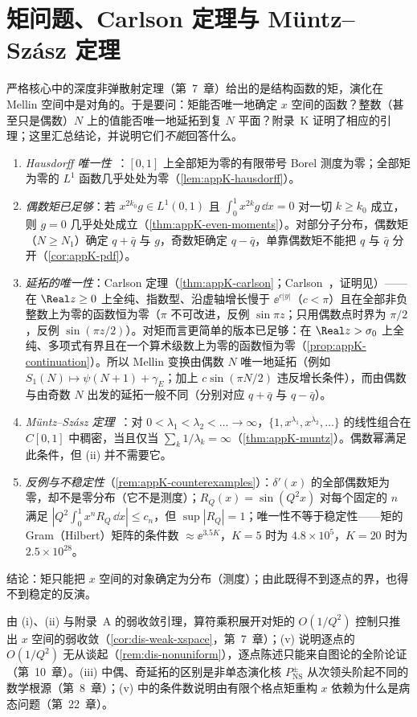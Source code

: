 \section{矩问题、Carlson 定理与 Müntz--Szász 定理}\label{sec:prelim-moments}

严格核心中的深度非弹散射定理（第~7~章）给出的是结构函数的矩，演化在 Mellin 空间中是对角的。于是要问：矩能否唯一地确定 $x$ 空间的函数？整数（甚至只是偶数）$N$ 上的值能否唯一地延拓到复 $N$ 平面？附录~K 证明了相应的引理；这里汇总结论，并说明它们\emph{不能}回答什么。

\begin{remark}[矩问题工具箱]\label{rem:prelim-moment-tools}
\begin{enumerate}[label=(\roman*),leftmargin=2.2em,itemsep=0pt,topsep=2pt]
\item \emph{Hausdorff 唯一性}~\cite{Hausdorff1923}：$[0,1]$ 上全部矩为零的有限带号 Borel 测度为零；全部矩为零的 $L^1$ 函数几乎处处为零（\cref{lem:appK-hausdorff}）。
\item \emph{偶数矩已足够}：若 $x^{2k_0}g\in L^1(0,1)$ 且 $\int_0^1x^{2k}g\,\dd x=0$ 对一切 $k\ge k_0$ 成立，则 $g=0$ 几乎处处成立（\cref{thm:appK-even-moments}）。对部分子分布，偶数矩（$N\ge N_1$）确定 $q+\bar q$ 与 $g$，奇数矩确定 $q-\bar q$，单靠偶数矩不能把 $q$ 与 $\bar q$ 分开（\cref{cor:appK-pdf}）。
\item \emph{延拓的唯一性}：Carlson 定理（\cref{thm:appK-carlson}；Carlson~\cite{Carlson1914}，证明见\cite[第~5.81~节]{Titchmarsh1939}）——在 $\Real z\ge0$ 上全纯、指数型、沿虚轴增长慢于 $\ee^{c|y|}$（$c<\pi$）且在全部非负整数上为零的函数恒为零（$\pi$ 不可改进，反例 $\sin\pi z$；只用偶数点时界为 $\pi/2$，反例 $\sin(\pi z/2)$）。对矩而言更简单的版本已足够：在 $\Real z>\sigma_0$ 上全纯、多项式有界且在一个算术级数上为零的函数恒为零（\cref{prop:appK-continuation}）。所以 Mellin 变换由偶数 $N$ 唯一地延拓（例如 $S_1(N)\mapsto\psi(N+1)+\gamma_E$；加上 $c\sin(\pi N/2)$ 违反增长条件），而由偶数与由奇数 $N$ 出发的延拓一般不同（分别对应 $q+\bar q$ 与 $q-\bar q$）。
\item \emph{Müntz--Szász 定理}~\cite{Muntz1914,Szasz1916}：对 $0<\lambda_1<\lambda_2<\dots\to\infty$，$\{1,x^{\lambda_1},x^{\lambda_2},\dots\}$ 的线性组合在 $C[0,1]$ 中稠密，当且仅当 $\sum_k1/\lambda_k=\infty$（\cref{thm:appK-muntz}）。偶数幂满足此条件，但 (ii) 并不需要它。
\item \emph{反例与不稳定性}（\cref{rem:appK-counterexamples}）：$\delta'(x)$ 的全部偶数矩为零，却不是零分布（它不是测度）；$R_Q(x)=\sin(Q^2x)$ 对每个固定的 $n$ 满足 $|Q^2\int_0^1x^nR_Q\,\dd x|\le c_n$，但 $\sup|R_Q|=1$；唯一性不等于稳定性——矩的 Gram（Hilbert）矩阵的条件数 $\approx\ee^{3.5K}$，$K=5$ 时为 $4.8\times10^5$，$K=20$ 时为 $2.5\times10^{28}$。%
\end{enumerate}
结论：矩只能把 $x$ 空间的对象确定为分布（测度）；由此既得不到逐点的界，也得不到稳定的反演。
\end{remark}

由 (i)、(ii) 与附录~A 的弱收敛引理，算符乘积展开对矩的 $O(1/Q^2)$ 控制只推出 $x$ 空间的弱收敛（\cref{cor:dis-weak-xspace}，第~7~章）；(v) 说明逐点的 $O(1/Q^2)$ 无从谈起（\cref{rem:dis-nonuniform}），逐点陈述只能来自图论的全阶论证（第~10~章）。(iii) 中偶、奇延拓的区别是非单态演化核 $P^\pm_{\mathrm{NS}}$ 从次领头阶起不同的数学根源（第~8~章）；(v) 中的条件数说明由有限个格点矩重构 $x$ 依赖为什么是病态问题（第~22~章）。
